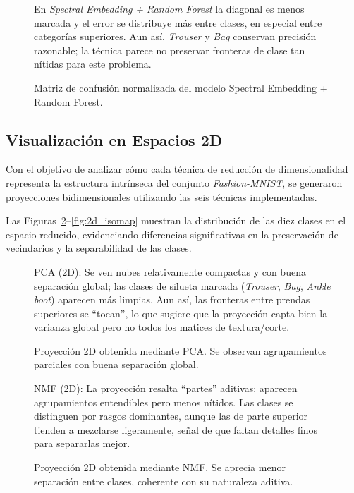 \documentclass[conference]{IEEEtran}
\begin{document}
\begin{figure}[!htbp]
\centering

\caption{Matriz de confusión normalizada del modelo Spectral Embedding + Random Forest.}
\label{fig:matriz_confusion_spectral_rf}
\vspace{1.2mm}
\parbox{0.95\columnwidth}{\footnotesize\raggedright En \textit{Spectral Embedding + Random Forest} la diagonal es menos marcada y el error se distribuye más entre clases, en especial entre categorías superiores. Aun así, \textit{Trouser} y \textit{Bag} conservan precisión razonable; la técnica parece no preservar fronteras de clase tan nítidas para este problema.}
\end{figure}

\FloatBarrier
\subsection{Visualización en Espacios 2D}

Con el objetivo de analizar cómo cada técnica de reducción de dimensionalidad representa la estructura intrínseca del conjunto \textit{Fashion-MNIST}, se generaron proyecciones bidimensionales utilizando las seis técnicas implementadas.  

Las Figuras~\ref{fig:2d_pca}–\ref{fig:2d_isomap} muestran la distribución de las diez clases en el espacio reducido, evidenciando diferencias significativas en la preservación de vecindarios y la separabilidad de las clases.

\begin{figure}[!htbp]
\centering

\vspace{-1mm}
\caption{Proyección 2D obtenida mediante PCA. Se observan agrupamientos parciales con buena separación global.}
\label{fig:2d_pca}
\vspace{0.2mm}
\parbox{0.95\columnwidth}{\footnotesize\raggedright PCA (2D): Se ven nubes relativamente compactas y con buena separación global; las clases de silueta marcada (\textit{Trouser}, \textit{Bag}, \textit{Ankle boot}) aparecen más limpias. Aun así, las fronteras entre prendas superiores se ``tocan'', lo que sugiere que la proyección capta bien la varianza global pero no todos los matices de textura/corte.}
\end{figure}

\begin{figure}[!htbp]
\centering

\vspace{-1mm}
\caption{Proyección 2D obtenida mediante NMF. Se aprecia menor separación entre clases, coherente con su naturaleza aditiva.}
\label{fig:2d_nmf}
\vspace{0.2mm}
\parbox{0.95\columnwidth}{\footnotesize\raggedright NMF (2D): La proyección resalta ``partes'' aditivas; aparecen agrupamientos entendibles pero menos nítidos. Las clases se distinguen por rasgos dominantes, aunque las de parte superior tienden a mezclarse ligeramente, señal de que faltan detalles finos para separarlas mejor.}
\end{figure}
\end{document}
